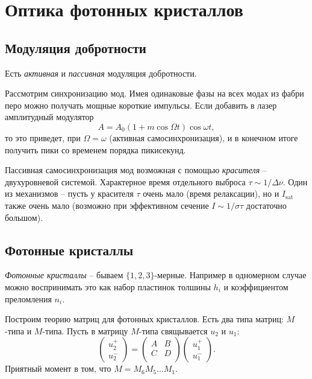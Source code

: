 \section{Оптика фотонных кристаллов}


\subsection{Модуляция добротности}


Есть \textit{активная} и \textit{пассивная} модуляция добротности. 

Рассмотрим синхронизацию мод. Имея одинаковые фазы на всех модах из фабри перо можно получать мощные короткие импульсы. Если добавить в лазер амплитудный модулятор
\begin{equation*}
    A = A_0 (1 + m \cos \Omega t) \cos \omega t,
\end{equation*}
то это приведет, при $\Omega = \omega$ (активная самосинхронизация), и в конечном итоге получить пики со временем порядка пикисекунд. 



Пассивная самосинхронизация мод возможная с помощью \textit{красителя} -- двухуровневой системой. Характерное время отдельного выброса $\tau \sim 1/\Delta \nu$. Один из механизмов -- пусть у красителя $\tau$  очень мало (время релаксации), но и $I_{\text{sat}}$ также очень мало (возможно при эффективном сечение $I \sim 1/\sigma\tau$ достаточно большом). 





\subsection{Фотонные кристаллы}

\textit{Фотонные кристаллы} -- бываем $\{1, 2, 3\}$-мерные. Например в одномерном случае можно воспринимать это как набор пластинок толшины $h_i$ и коэффициентом преломления $n_i$. 


Построим теорию матриц для фотонных кристаллов. Есть два типа матриц: $M$-типа и $M$-типа. Пусть в матрицу $M$-типа свящывается $u_2$ и $u_1$:
\begin{equation*}
    \begin{pmatrix}
        u_2^+ \\ u_2^-
    \end{pmatrix} = 
    \begin{pmatrix}
        A & B \\
        C & D \\
    \end{pmatrix}
    \begin{pmatrix}
        u_1^+ \\ u_1^-
    \end{pmatrix}.
\end{equation*}
Приятный момент в том, что $M = M_6 M_5 \ldots M_1$. 

